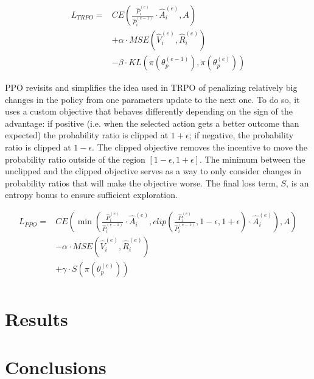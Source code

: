 \documentclass{article}
\begin{document}
\begin{equation}
  \label{eq:trpo}
  \begin{aligned}
    L_{TRPO}={} & CE\left(\frac{\hat{P}_i^{(e)}}{\hat{P}_i^{(e-1)}}\cdot \hat{A}_i^{(e)}, A\right) \\
    & + \alpha\cdot MSE\left(\hat{V}_i^{(e)}, \hat{R}_i^{(e)}\right) \\
    & - \beta\cdot KL\left(\pi(\theta_p^{(e-1)}), \pi(\theta_p^{(e)})\right)
  \end{aligned}
\end{equation}

PPO revisits and simplifies the idea used in TRPO of penalizing relatively big changes in the policy from one parameters update to the next one. To do so, it uses a custom objective that behaves differently depending on the sign of the advantage: if positive (i.e. when the selected action gets a better outcome than expected) the probability ratio is clipped at $1+\epsilon$; if negative, the probability ratio is clipped at $1-\epsilon$. The clipped objective removes the incentive to move the probability ratio outside of the region $[1-\epsilon, 1+\epsilon]$. The minimum between the unclipped and the clipped objective serves as a way to only consider changes in probability ratios that will make the objective worse. The final loss term, $S$, is an entropy bonus to ensure sufficient exploration.

\begin{equation}
  \label{eq:ppo}
  \begin{aligned}
    L_{PPO}={} & CE\left(\min\left(\frac{\hat{P}_i^{(e)}}{\hat{P}_i^{(e-1)}}\cdot \hat{A}_i^{(e)}, clip\left(\frac{\hat{P}_i^{(e)}}{\hat{P}_i^{(e-1)}}, 1-\epsilon, 1+\epsilon\right)\cdot \hat{A}_i^{(e)}\right), A\right) \\
    & - \alpha\cdot MSE\left(\hat{V}_i^{(e)}, \hat{R}_i^{(e)}\right) \\
    & + \gamma\cdot S\left(\pi(\theta_p^{(e)})\right) \\
  \end{aligned}
\end{equation}

\section{Results}

\section{Conclusions}


\end{document}
